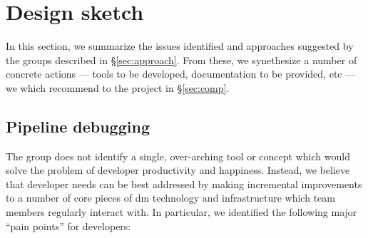 \section{Design sketch}
\label{sec:design}

In this section, we summarize the issues identified and approaches suggested
by the groups described in \S\ref{sec:approach}. From these, we synethesize a
number of concrete actions --- tools to be developed, documentation to be
provided, etc --- we which recommend to the project in \S\ref{sec:comp}.

\subsection{Pipeline debugging}
\label{sec:design:debug}


The group does not identify a single, over-arching tool or concept which would
solve the problem of developer productivity and happiness. Instead, we believe
that developer needs can be best addressed by making incremental improvements
to a number of core pieces of \gls{dm} technology and infrastructure which
team members regularly interact with. In particular, we identified the
following major ``pain points'' for developers:

